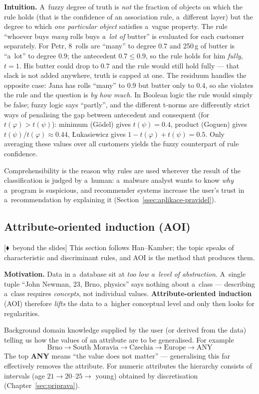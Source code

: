 \documentclass[11pt,a4paper]{article}
\theoremstyle{definition}
\providecommand{\uv}[1]{``#1''}
\newcommand{\mimo}{\textcolor{markcol}{\textsf{\footnotesize[$\blacklozenge$~beyond the slides]}}}
\begin{document}
\textbf{Intuition.} A~fuzzy degree of truth is \emph{not} the fraction of objects on
which the rule holds (that is the confidence of an association rule, a~different layer)
but the degree to which \emph{one particular object} satisfies a~vague property. The rule
``whoever buys \emph{many} rolls buys \emph{a~lot of} butter'' is evaluated for each
customer separately. For Petr, 8~rolls are ``many'' to degree $0.7$ and 250\,g of butter
is ``a~lot'' to degree $0.9$; the antecedent $0.7 \le 0.9$, so the rule holds for him
\emph{fully}, $t = 1$. His butter could drop to $0.7$ and the rule would still hold
fully --- that slack is not added anywhere, truth is capped at one. The residuum handles
the opposite case: Jana has rolls ``many'' to $0.9$ but butter only to $0.4$, so she
violates the rule and the question is \emph{by how much}. In Boolean logic the rule would
simply be false; fuzzy logic says ``partly'', and the different t-norms are differently
strict ways of penalising the gap between antecedent and consequent (for
$t(\varphi) > t(\psi)$): minimum (Gödel) gives $t(\psi) = 0.4$, product (Goguen) gives
$t(\psi)/t(\varphi) \approx 0.44$, Łukasiewicz gives $1 - t(\varphi) + t(\psi) = 0.5$.
Only averaging these values over all customers yields the fuzzy counterpart of rule
confidence.

Comprehensibility is the reason why rules are used wherever the result of the
classification is judged by a~human: a~malware analyst wants to know \emph{why}
a~program is suspicious, and recommender systems increase the user's trust in
a~recommendation by explaining it (Section~\ref{ssec:aplikace-pravidel}).

\subsection{Attribute-oriented induction (AOI)}
\label{ssec:aoi}

\mimo{} This section follows Han--Kamber; the topic speaks of characteristic and discriminant
rules, and AOI is the method that produces them.

\textbf{Motivation.} Data in a~database sit at \emph{too low a~level of abstraction}. A~single
tuple \uv{John Newman, 23, Brno, physics} says nothing about a~class --- describing a~class
requires \emph{concepts}, not individual values. \textbf{Attribute-oriented induction} (AOI)
therefore \emph{lifts} the data to a~higher conceptual level and only then looks for
regularities.

\begin{defbox}
Background domain knowledge supplied by the user (or derived from the data) telling us how the
values of an attribute are to be generalised. For example
\[ \text{Brno} \to \text{South Moravia} \to \text{Czechia} \to \text{Europe} \to \mathrm{ANY} \]
The top \textbf{ANY} means \uv{the value does not matter} --- generalising this far effectively
removes the attribute. For numeric attributes the hierarchy consists of intervals
(age $21 \to 20$--$25 \to$ young) obtained by discretisation (Chapter~\ref{sec:priprava}).
\end{defbox}
\end{document}
